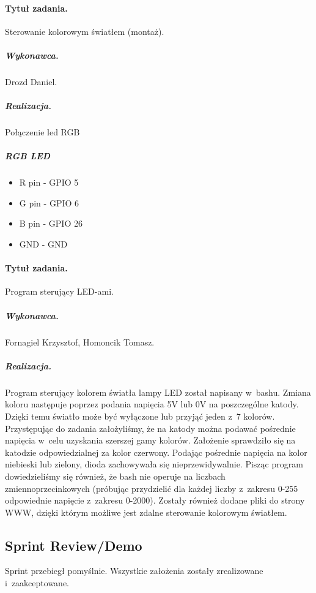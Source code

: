 \paragraph{Tytuł zadania.} Sterowanie kolorowym światłem (montaż).
\subparagraph{Wykonawca.} Drozd Daniel.
\subparagraph{Realizacja.} Połączenie led RGB
\subparagraph{RGB LED}

\begin{itemize}
	\item R pin - GPIO 5
	\item G pin - GPIO 6
	\item B pin - GPIO 26
	\item GND - GND
\end{itemize}

\paragraph{Tytuł zadania.} Program sterujący LED-ami.
\subparagraph{Wykonawca.} Fornagiel Krzysztof, Homoncik Tomasz.
\subparagraph{Realizacja.} Program sterujący kolorem światła lampy LED został napisany w~bashu. Zmiana koloru następuje poprzez podania napięcia 5V lub 0V na poszczególne katody. Dzięki temu światło może być wyłączone lub przyjąć jeden z~7 kolorów. Przystępując do zadania założyliśmy, że na katody można podawać pośrednie napięcia w~celu uzyskania szerszej gamy kolorów. Założenie sprawdziło się na katodzie odpowiedzialnej za kolor czerwony. Podając pośrednie napięcia na kolor niebieski lub zielony, dioda zachowywała się nieprzewidywalnie. Pisząc program dowiedzieliśmy się również, że bash nie operuje na liczbach zmiennoprzecinkowych (próbując przydzielić dla każdej liczby z~zakresu 0-255 odpowiednie napięcie z~zakresu 0-2000). Zostały również dodane pliki do strony WWW, dzięki którym możliwe jest zdalne sterowanie kolorowym światłem.


\subsection{Sprint Review/Demo}
Sprint przebiegł pomyślnie. Wszystkie założenia zostały zrealizowane i~zaakceptowane.
